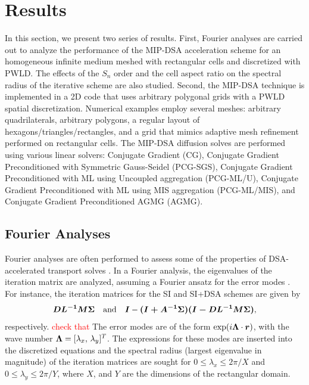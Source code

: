 \section{Results} \label{sec_res}

In this section, we present two series of results. First, Fourier analyses are 
carried out to analyze the performance of the MIP-DSA acceleration scheme 
for an homogeneous infinite medium meshed with rectangular cells and discretized with PWLD.
The effects of the $S_n$ order and the cell aspect ratio on the spectral radius of the iterative 
scheme are also studied. Second, the MIP-DSA technique is implemented in a 2D \sn code that uses
arbitrary polygonal grids with a PWLD spatial discretization.  Numerical examples employ
several meshes: arbitrary quadrilaterals, arbitrary polygons, a regular layout of 
hexagons/triangles/rectangles, and a grid that mimics adaptive mesh refinement 
performed on rectangular cells. The MIP-DSA diffusion solves are performed using various
linear solvers: Conjugate Gradient (CG), Conjugate Gradient
Preconditioned with Symmetric Gauss-Seidel (PCG-SGS), Conjugate Gradient
Preconditioned with ML using Uncoupled aggregation (PCG-ML/U),
Conjugate Gradient Preconditioned with ML using MIS aggregation (PCG-ML/MIS),
and Conjugate Gradient Preconditioned AGMG (AGMG). 

\subsection{Fourier Analyses}

Fourier analyses are often performed to assess some of the properties of 
DSA-accelerated transport solves \cite{larsen_dsa,consistent_p1,more}. In a Fourier analysis,
the eigenvalues of the iteration matrix are analyzed, assuming a Fourier ansatz for the 
error modes \cite{}. For instance, the iteration matrices for the SI and SI+DSA schemes are given by
\begin{equation}
\boldsymbol{D L^{-1}M \Sigma} \quad \text{and} \quad \boldsymbol{I}-\boldsymbol{(I+A^{-1}\Sigma)(I-D L^{-1}M \Sigma)},
\end{equation}
respectively. \textcolor{red}{check that} The error modes are of the form $\exp(i \boldsymbol{\Lambda} \cdot \boldsymbol{r})$, with the
wave number $\boldsymbol{\Lambda}=[\lambda_x,\, \lambda_y]^T$. The expressions for these modes 
are inserted into the discretized equations and the spectral radius (largest eigenvalue in magnitude)
of the iteration matrices are sought for $0 \le \lambda_x \le 2\pi/X$ and $0 \le \lambda_y \le 2\pi/Y$,
where $X$, and $Y$ are the dimensions of the rectangular domain.


